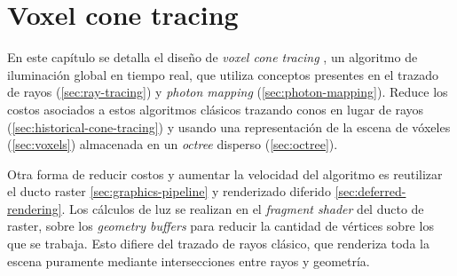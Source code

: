 


\graphicspath{{chapters/3_diseño/figures/}}

\chapter{Voxel cone tracing}\label{chap:design}

En este capítulo se detalla el diseño de \textit{voxel cone tracing} \cite{voxel-cone-tracing}, un algoritmo de iluminación global en tiempo real, que utiliza conceptos presentes en el trazado de rayos (\ref{sec:ray-tracing}) y \textit{photon mapping} (\ref{sec:photon-mapping}).
Reduce los costos asociados a estos algoritmos clásicos trazando conos en lugar de rayos (\ref{sec:historical-cone-tracing}) y usando una representación de la escena de vóxeles (\ref{sec:voxels}) almacenada en un \textit{octree} disperso (\ref{sec:octree}).

Otra forma de reducir costos y aumentar la velocidad del algoritmo es reutilizar el ducto raster \ref{sec:graphics-pipeline} y renderizado diferido \ref{sec:deferred-rendering}.
Los cálculos de luz se realizan en el \textit{fragment shader} del ducto de raster, sobre los \textit{geometry buffers} para reducir la cantidad de vértices sobre los que se trabaja.
Esto difiere del trazado de rayos clásico, que renderiza toda la escena puramente mediante intersecciones entre rayos y geometría.

